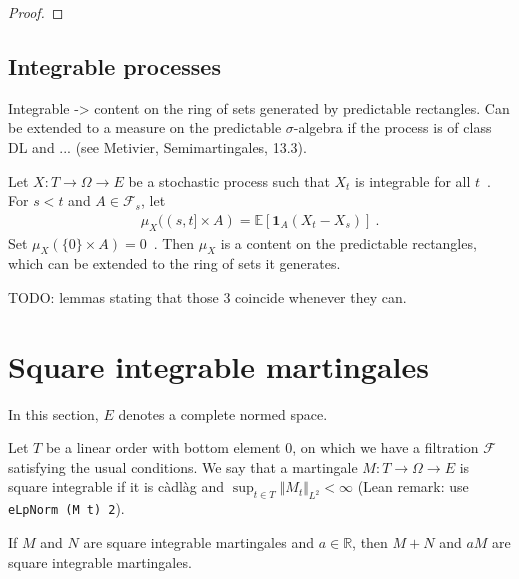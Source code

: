 \begin{proof}

\end{proof}




\subsection{Integrable processes}

Integrable -> content on the ring of sets generated by predictable rectangles.
Can be extended to a measure on the predictable $\sigma$-algebra if the process is of class DL and ... (see Metivier, Semimartingales, 13.3).

Let $X : T \to \Omega \to E$ be a stochastic process such that $X_t$ is integrable for all $t$~.
For $s < t$ and $A \in \mathcal{F}_s$, let
\begin{align*}
  \mu_X((s, t] \times A) = \mathbb{E}[\mathbf{1}_A (X_t - X_s)]
  \: .
\end{align*}
Set $\mu_X(\{0\} \times A) = 0$~.
Then $\mu_X$ is a content on the predictable rectangles, which can be extended to the ring of sets it generates.

TODO: lemmas stating that those 3 coincide whenever they can.



\section{Square integrable martingales}

In this section, $E$ denotes a complete normed space.

\begin{definition}\label{def:IsSquareIntegrable}
  \leanok
Let $T$ be a linear order with bottom element 0, on which we have a filtration $\mathcal{F}$ satisfying the usual conditions.
We say that a martingale $M : T \to \Omega \to E$ is square integrable if it is càdlàg and $\sup_{t \in T} \Vert M_t \Vert_{L^2} < \infty$ (Lean remark: use \texttt{eLpNorm (M t) 2}).
\end{definition}


\begin{lemma}\label{lem:IsSquareIntegrable.module}
If $M$ and $N$ are square integrable martingales and $a \in \mathbb{R}$, then $M + N$ and $a M$ are square integrable martingales.
\end{lemma}

